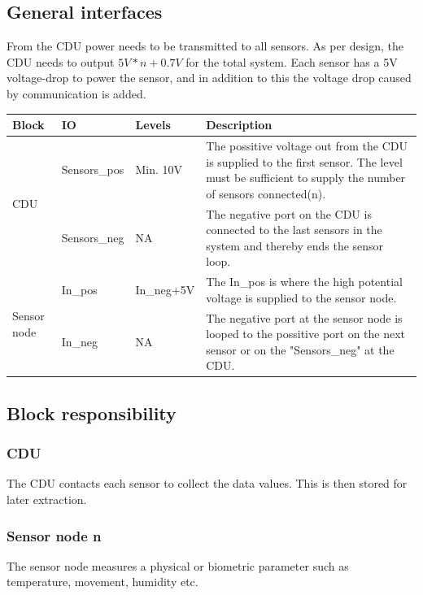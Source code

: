 \subsection{General interfaces}
From the CDU power needs to be transmitted to all sensors. As per design, the CDU needs to output $5V*n+0.7V$ for the total system. Each sensor has a 5V voltage-drop to power the sensor, and in addition to this the voltage drop caused by communication is added.
\begin{table}[H]
\begin{center}
\begin{tabular}{ p{2.5cm} p{2cm} p{2cm} p{7cm} }
\hline
\textbf{Block} & \textbf{IO} & \textbf{Levels} & \textbf{Description} \\\hline
\multirow{2}{2.5cm}[-3.5em]{CDU} & Sensors\_pos & Min. 10V & The possitive voltage out from the CDU is supplied to the first sensor. The level must be sufficient to supply the number of sensors connected(n).\\ \cline{2-4}
 & Sensors\_neg & NA & The negative port on the CDU is connected to the last sensors in the system and thereby ends the sensor loop. \\ \hline
\multirow{2}{2.5cm}[-3em]{Sensor node} & In\_pos & In\_neg+5V &The In\_pos is where the high potential voltage is supplied to the sensor node. \\ \cline{2-4}
& In\_neg & NA & The negative port at the sensor node is looped to the possitive port on the next sensor or on the "Sensors\_neg" at the CDU. \\ \hline
\end{tabular}
\end{center}
\end{table}

\subsection{Block responsibility}
\subsubsection{CDU}
The CDU contacts each sensor to collect the data values. This is then stored for later extraction.

\subsubsection{Sensor node n}
The sensor node measures a physical or biometric parameter such as temperature, movement, humidity etc.

